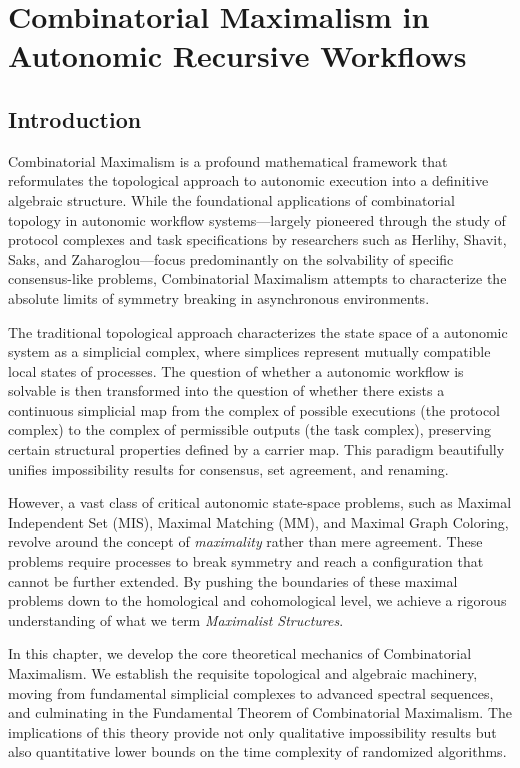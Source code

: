 \chapter{Combinatorial Maximalism in Autonomic Recursive Workflows}

\section{Introduction}

Combinatorial Maximalism is a profound mathematical framework that reformulates the topological approach to autonomic execution into a definitive algebraic structure. While the foundational applications of combinatorial topology in autonomic workflow systems---largely pioneered through the study of protocol complexes and task specifications by researchers such as Herlihy, Shavit, Saks, and Zaharoglou---focus predominantly on the solvability of specific consensus-like problems, Combinatorial Maximalism attempts to characterize the absolute limits of symmetry breaking in asynchronous environments. 

The traditional topological approach characterizes the state space of a autonomic system as a simplicial complex, where simplices represent mutually compatible local states of processes. The question of whether a autonomic workflow is solvable is then transformed into the question of whether there exists a continuous simplicial map from the complex of possible executions (the protocol complex) to the complex of permissible outputs (the task complex), preserving certain structural properties defined by a carrier map. This paradigm beautifully unifies impossibility results for consensus, set agreement, and renaming.

However, a vast class of critical autonomic state-space problems, such as Maximal Independent Set (MIS), Maximal Matching (MM), and Maximal Graph Coloring, revolve around the concept of \textit{maximality} rather than mere agreement. These problems require processes to break symmetry and reach a configuration that cannot be further extended. By pushing the boundaries of these maximal problems down to the homological and cohomological level, we achieve a rigorous understanding of what we term \textit{Maximalist Structures}.

In this chapter, we develop the core theoretical mechanics of Combinatorial Maximalism. We establish the requisite topological and algebraic machinery, moving from fundamental simplicial complexes to advanced spectral sequences, and culminating in the Fundamental Theorem of Combinatorial Maximalism. The implications of this theory provide not only qualitative impossibility results but also quantitative lower bounds on the time complexity of randomized algorithms.

